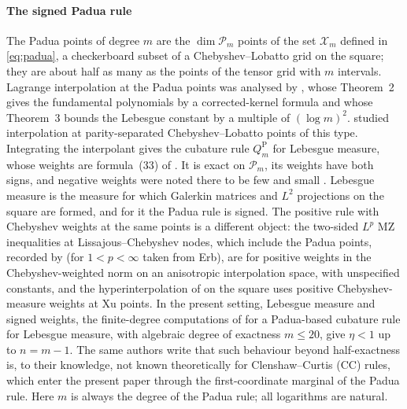 \documentclass[preprint,12pt,a4paper]{elsarticle}
\theoremstyle{remark}
\begin{document}
\paragraph{The signed Padua rule}
The Padua points of degree $m$ are the $\dim\mathcal P_m$ points of the set
$\mathcal X_m$ defined in \eqref{eq:padua}, a checkerboard subset of a
Chebyshev--Lobatto grid on the square; they are about half as many as the
points of the tensor grid with $m$ intervals. Lagrange interpolation at the
Padua points was analysed by \citet{BCDMVX06}, whose Theorem~2 gives the
fundamental polynomials by a corrected-kernel formula and whose Theorem~3
bounds the Lebesgue constant by a multiple of $(\log m)^2$.
\citet{Xu96} studied interpolation at parity-separated
Chebyshev--Lobatto points of this type. Integrating the interpolant gives the
cubature rule $Q_m^{\mathrm P}$ for Lebesgue measure, whose weights are
formula~(33) of \citet{SVZ08}. It is exact on $\mathcal P_m$, its weights have
both signs, and negative weights were noted there to be few and small
\citep[p.~421]{SVZ08}. Lebesgue measure is the measure for which Galerkin
matrices and $L^2$ projections on the square are formed, and for it the Padua
rule is signed. The positive rule with Chebyshev weights at the same points
is a different object: the two-sided $L^p$ MZ inequalities at
Lissajous--Chebyshev nodes, which include the Padua points, recorded by
\citet[Lemma~5.1]{KLP18} (for $1<p<\infty$ taken from Erb), are for positive
weights in the Chebyshev-weighted norm on an anisotropic interpolation space,
with unspecified constants, and the hyperinterpolation
of \citet{CDMV07} on the square uses positive Chebyshev-measure weights
at Xu points. In the present setting, Lebesgue measure and signed weights, the
finite-degree computations of \citet{ASV27} for a Padua-based cubature rule for
Lebesgue measure, with algebraic degree of exactness $m\le20$, give $\eta<1$ up to
$n=m-1$. The same authors write that such behaviour beyond half-exactness is, to
their knowledge, not known theoretically for Clenshaw--Curtis (CC) rules, which
enter the present paper through the first-coordinate marginal of the Padua rule.
Here $m$ is always the degree of the Padua rule;
all logarithms are natural.
\end{document}

